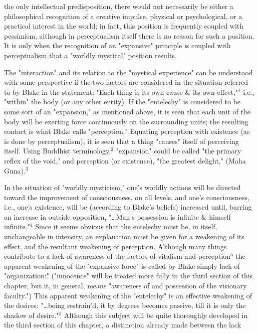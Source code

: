 \noindent the only intellectual predisposition, there would not necessarily be either a philosophical recognition of a creative impulse, physical
or psychological, or a practical interest in the world; in fact, this position is frequently coupled with pessimism, although in 
perceptualism itself there is no reason for such a position. It is only when the recognition of an "expansive" principle is 
coupled with perceptualism that a "worldly mystical" position results.\par
\vspace*{0.5\baselineskip}
The "interaction" and its relation to the "mystical experience" can be understood with some perspective if the two factors
are considered in the situation referred to by Blake in the statement: "Each thing is its own cause \& its own effect,"$^{1}$ i.e., "within" the body (or any other entity). If the
"entelechy" is considered to be some sort of an "expansion," as mentioned above, it is seen that each unit of the body will be exerting force continuously on the surrounding
units; the resulting contact is what Blake calls "perception." Equating perception with existence (as is done by perceptualism), it is seen that a thing
"causes" itself of perceiving itself. Using Buddhist terminology,$^{2}$ "expansion" could be called "the primary reflex of the void," and perception (or existence), "the greatest delight," (Maha Guna).$^{3}$\par
In the situation of "worldly mysticism," one's worldly actions will be directed toward the improvement of consciousness, on all levels, and
one's consciousness, i.e., one's existence, will be (according to Blake's beliefs) increased until, barring an increase in outside opposition, "\dots Man's 
possession is infinite \& himself infinite."$^{4}$ Since it seems obvious that the entelechy must be, in itself, unchangeable
in intensity, an explanation must be given for a weakening of its effect, and the resultant weakening of perception. Although
many things contribute to a lack of awareness of the factors of vitalism and perception$^{5}$ the apparent weakening of the "expansive force" is called
by Blake simply lack of "organization:" ("innocence" will be treated more fully
in the third section of this chapter, but it, in general, means "awareness of and possession of the visionary faculty.")
This apparent weakening of the "entelechy" is an effective weakening of the desires: "\dots being restrain'd, it by degrees becomes passive, till it is only the shadow of desire."$^{5}$
Although this subject will be quite thoroughly developed in the third section of this chapter, a distinction already made between the lack
